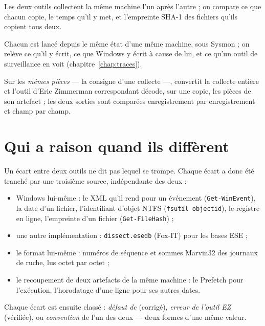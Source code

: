 \documentclass[11pt,a4paper,oneside]{report}
\begin{document}
\begin{description}[style=nextline,leftmargin=1em]
  \item[Collecte : \wac{} face à KAPE] Les deux outils collectent la même
        machine l'un après l'autre ; on compare ce que chacun copie, le temps
        qu'il y met, et l'empreinte SHA-1 des fichiers qu'ils copient tous deux.
  \item[Traces laissées : \wac{}, KAPE et les outils EZ] Chacun est lancé depuis
        le même état d'une même machine, sous Sysmon ; on relève ce qu'il y
        écrit, ce que Windows y écrit à cause de lui, et ce qu'un outil de
        surveillance en voit (chapitre~\ref{chap:traces}).
  \item[Décodage : \wac{} face aux outils EZ] Sur les \emph{mêmes pièces} --- la
        consigne d'une collecte \wac{} ---, \wac{} convertit la collecte entière
        et l'outil d'Eric Zimmerman correspondant décode, sur une copie, les
        pièces de son artefact ; les deux sorties sont comparées enregistrement
        par enregistrement et champ par champ.
\end{description}

\section{Qui a raison quand ils diffèrent}

Un écart entre deux outils ne dit pas lequel se trompe. Chaque écart a donc été
tranché par une troisième source, indépendante des deux :

\begin{itemize}[nosep]
  \item Windows lui-même : le XML qu'il rend pour un événement
        (\texttt{Get-WinEvent}), la date d'un fichier, l'identifiant d'objet
        NTFS (\texttt{fsutil objectid}), le registre en ligne, l'empreinte d'un
        fichier (\texttt{Get-FileHash}) ;
  \item une autre implémentation : \texttt{dissect.esedb} (Fox-IT) pour les bases
        ESE ;
  \item le format lui-même : numéros de séquence et sommes Marvin32 des journaux
        de ruche, lus octet par octet ;
  \item le recoupement de deux artefacts de la même machine : le Prefetch pour
        l'exécution, l'horodatage d'une ligne pour ses autres dates.
\end{itemize}

Chaque écart est ensuite classé : \emph{défaut de \wac{}} (corrigé), \emph{erreur
de l'outil EZ} (vérifiée), ou \emph{convention} de l'un des deux --- deux formes
d'une même valeur.
\end{document}
